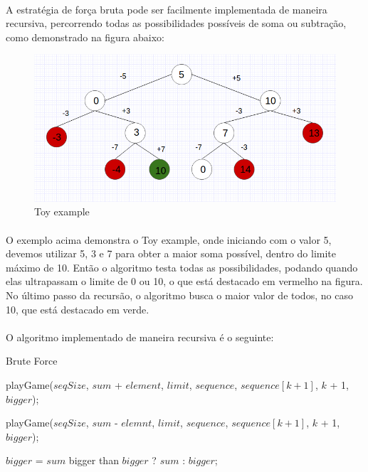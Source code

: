 \documentclass[a4paper, 12pt]{article}
\begin{document}
\paragraph{}
A estratégia de força bruta pode ser facilmente implementada de maneira recursiva, percorrendo todas as possibilidades possíveis de soma ou subtração, como demonstrado na figura abaixo:
\begin{figure}[!h]
\centering
\includegraphics[scale=0.4]{sum.png}
\caption{Toy example}
\end{figure}

\paragraph{}
O exemplo acima demonstra o Toy example, onde iniciando com o valor 5, devemos utilizar 5, 3 e 7 para obter a maior soma possível, dentro do limite máximo de 10. Então o algoritmo testa todas as possibilidades, podando quando elas ultrapassam o limite de 0 ou 10, o que está destacado em vermelho na figura. No último passo da recursão, o algoritmo busca o maior valor de todos, no caso 10, que está destacado em verde.

\paragraph{}
O algoritmo implementado de maneira recursiva é o seguinte:


\begin{algorithm}
\caption{Brute Force}
\begin{algorithmic}
		\State playGame($seqSize$, $sum$ + $element$, $limit$, $sequence$, $sequence[k + 1]$, $k$ + 1, $bigger$);    
    		
	\EndIf
		\State playGame($seqSize$, $sum$ - $elemnt$, $limit$, $sequence$, $sequence[k + 1]$, $k$ + 1, $bigger$);    
    		
	\EndIf 
		\State $bigger$ = $sum$ bigger than $bigger$ ? $sum$ : $bigger$;    
    		
	\EndIf  
    
\EndFunction
\end{algorithmic}
\end{algorithm}
\end{document}

